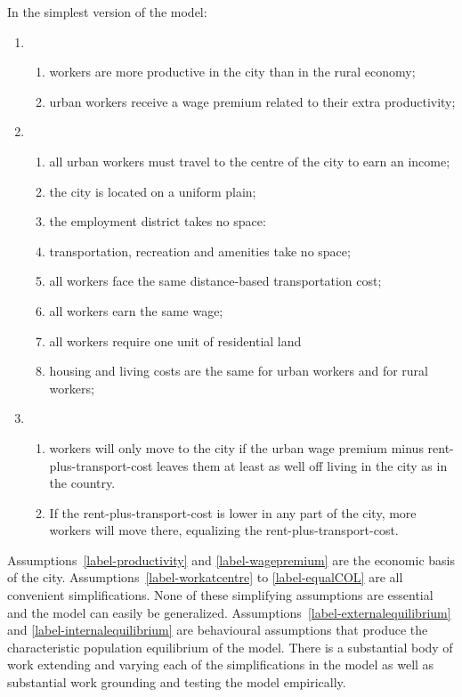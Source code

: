 In the simplest version of the model:
\begin{enumerate}
    \item 
    \begin{enumerate}\item \label{label-productivity}workers are more productive in the city than in the rural economy;
    \item \label{label-wagepremium}urban  workers receive a wage premium related to their extra productivity;  
    \end{enumerate}
    \item \begin{enumerate}\item\label{label-workatcentre}all urban workers must travel to the centre of the city to earn an income;
    \item \label{label-uniformplain}the city is located on a uniform plain; 
    \item \label{label-emplymentspace}the employment district takes no space:
    \item \label{label-transportspace}transportation, recreation and amenities take no space;
    \item \label{label-equaltransportcost}all workers face the same distance-based transportation cost;
    \item \label{label-equalwage}all workers earn the same wage;
    \item \label{label-equalland}all workers require one unit of residential land
    \item \label{label-equalCOL}housing and living costs are the same for urban workers and for rural workers;
    \end{enumerate}
    \item \begin{enumerate}\item\label{label-externalequilibrium}workers will only move to the city if the \gls{urban wage premium} minus rent-plus-transport-cost leaves them at least as well off living in the city as in the country.
    \item \label{label-internalequilibrium}If the rent-plus-transport-cost is lower in any part of the city, more workers will move there, equalizing the rent-plus-transport-cost.
    \end{enumerate}
\end{enumerate}

Assumptions~\ref{label-productivity} and \ref{label-wagepremium} are the economic basis of the city. Assumptions~\ref{label-workatcentre}  to \ref{label-equalCOL} are all convenient simplifications. None of these simplifying assumptions are essential and the model can easily be generalized. %
Assumptions~\ref{label-externalequilibrium} and \ref{label-internalequilibrium} are behavioural assumptions that produce the characteristic population \gls{equilibrium} of the model. There is a substantial body of work extending and varying each of the simplifications in the model as well as substantial work grounding and testing the model empirically.


